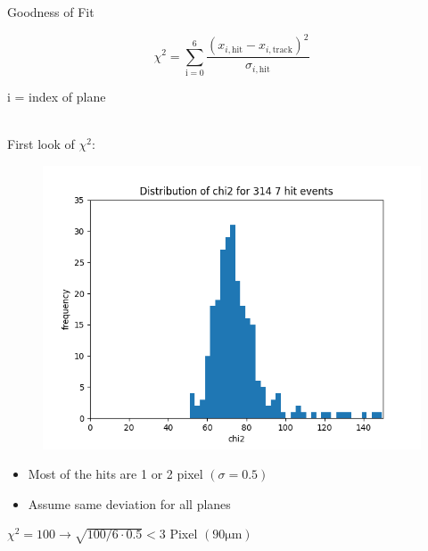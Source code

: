 \documentclass{beamer}
\begin{document}
\begin{frame}{Goodness of Fit}
    \begin{minipage}{.49\textwidth}
    \[ \chi^2 = \sum_{\text{i} = 0} ^6 \frac{ \left(
	    x _{i,\text{hit}} - x _{i,\text{track}} \right) ^2}{
	    \sigma _{i,\text{hit}}} \]
    \end{minipage}
    \begin{minipage}{.49\textwidth}
    i = index of plane
    \end{minipage}\\[.5cm]
    \LARGE First look of \( \chi ^{2} \): \\[.5cm]
    \begin{minipage}{.49\textwidth}
    \begin{figure}[H]
	\centering 
	\includegraphics[width=\textwidth]{chi2_secondlook.png}
    \end{figure}
    \end{minipage}
    \begin{minipage}{.45\textwidth}
	\footnotesize
	\begin{itemize}
	    \item Most of the hits are 1 or 2 pixel \( ( \sigma = 0.5 ) \)
	    \item Assume same deviation for all planes \\[.5cm]
	\end{itemize} 
	\tiny
	\( \chi ^2 = 100 \rightarrow \sqrt{100/6 \cdot 0.5} < 3\)
	Pixel \( (90 \si{\micro \meter} )\) 
    \end{minipage}
\end{frame}
\end{document}
